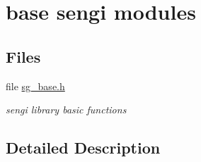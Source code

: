 \hypertarget{group___s_g___b_a_s_e}{}\section{base sengi modules}
\label{group___s_g___b_a_s_e}
\subsection*{Files}
\begin{DoxyCompactItemize}
\item 
file \hyperlink{sg__base_8h}{sg\+\_\+base.\+h}
\begin{DoxyCompactList}\small\item\em sengi library basic functions \end{DoxyCompactList}\end{DoxyCompactItemize}


\subsection{Detailed Description}

